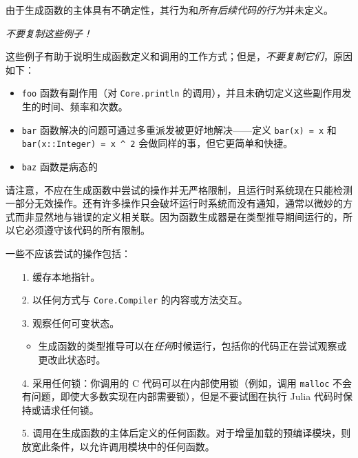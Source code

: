 由于生成函数的主体具有不确定性，其行为和\emph{所有后续代码的行为}并未定义。



\emph{不要复制这些例子！}



这些例子有助于说明生成函数定义和调用的工作方式；但是，\emph{不要复制它们}，原因如下：



\begin{itemize}
\item \texttt{foo} 函数有副作用（对 \texttt{Core.println} 的调用），并且未确切定义这些副作用发生的时间、频率和次数。


\item \texttt{bar} 函数解决的问题可通过多重派发被更好地解决——定义 \texttt{bar(x) = x} 和 \texttt{bar(x::Integer) = x {\textasciicircum} 2} 会做同样的事，但它更简单和快捷。


\item \texttt{baz} 函数是病态的

\end{itemize}


请注意，不应在生成函数中尝试的操作并无严格限制，且运行时系统现在只能检测一部分无效操作。还有许多操作只会破坏运行时系统而没有通知，通常以微妙的方式而非显然地与错误的定义相关联。因为函数生成器是在类型推导期间运行的，所以它必须遵守该代码的所有限制。



一些不应该尝试的操作包括：



\begin{itemize}
\item[1. ] 缓存本地指针。


\item[2. ] 以任何方式与 \texttt{Core.Compiler} 的内容或方法交互。


\item[3. ] 观察任何可变状态。

\begin{itemize}
\item 生成函数的类型推导可以在\emph{任何}时候运行，包括你的代码正在尝试观察或更改此状态时。

\end{itemize}

\item[4. ] 采用任何锁：你调用的 C 代码可以在内部使用锁（例如，调用 \texttt{malloc} 不会有问题，即使大多数实现在内部需要锁），但是不要试图在执行 Julia 代码时保持或请求任何锁。


\item[5. ] 调用在生成函数的主体后定义的任何函数。对于增量加载的预编译模块，则放宽此条件，以允许调用模块中的任何函数。

\end{itemize}


